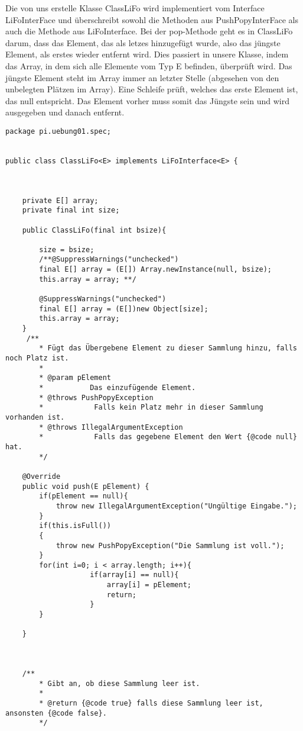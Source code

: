 \documentclass{pi2}
\begin{document}
Die von uns erstelle Klasse ClassLiFo wird implementiert vom Interface LiFoInterFace und überschreibt sowohl die Methoden aus PushPopyInterFace als auch die Methode aus LiFoInterface.
Bei der pop-Methode geht es in ClassLiFo darum, dass das Element, das als letzes hinzugefügt wurde, also das jüngste Element, als erstes wieder entfernt wird. Dies passiert in unsere Klasse, indem das Array, in dem sich alle Elemente vom Typ E befinden, überprüft wird. Das jüngste Element steht im Array immer an letzter Stelle (abgesehen von den unbelegten Plätzen im Array). Eine Schleife prüft, welches das erste Element ist, das null entspricht. Das Element vorher muss somit das Jüngste sein und wird ausgegeben und danach entfernt.

\begin{lstlisting}
package pi.uebung01.spec;


public class ClassLiFo<E> implements LiFoInterface<E> {
	
	
	
	private E[] array;
	private final int size;
	
	public ClassLiFo(final int bsize){
		
		size = bsize;
		/**@SuppressWarnings("unchecked")
        final E[] array = (E[]) Array.newInstance(null, bsize);
        this.array = array; **/
		
        @SuppressWarnings("unchecked")
        final E[] array = (E[])new Object[size];
        this.array = array;
	}
	 /**
	    * Fügt das Übergebene Element zu dieser Sammlung hinzu, falls noch Platz ist.
	    *
	    * @param pElement
	    *           Das einzufügende Element.
	    * @throws PushPopyException
	    *            Falls kein Platz mehr in dieser Sammlung vorhanden ist.
	    * @throws IllegalArgumentException
	    *            Falls das gegebene Element den Wert {@code null} hat.
	    */

	@Override
	public void push(E pElement) {
		if(pElement == null){
			throw new IllegalArgumentException("Ungültige Eingabe.");
		}
		if(this.isFull())
		{
			throw new PushPopyException("Die Sammlung ist voll.");
		}
		for(int i=0; i < array.length; i++){
					if(array[i] == null){
						array[i] = pElement;
						return;
					}
		}
			
	}
				
	
	
	/**
	    * Gibt an, ob diese Sammlung leer ist.
	    *
	    * @return {@code true} falls diese Sammlung leer ist, ansonsten {@code false}.
	    */
	

\end{lstlisting}
\end{document}
